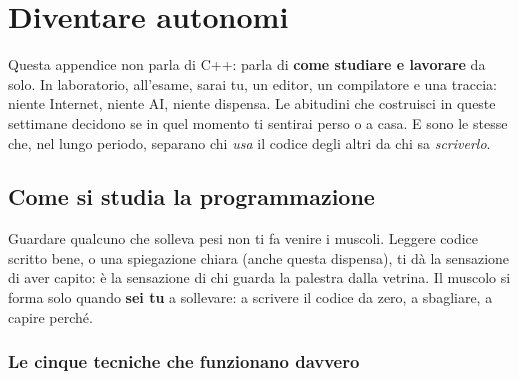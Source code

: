 \chapter{Diventare autonomi}

Questa appendice non parla di C++: parla di \textbf{come studiare e lavorare} da solo. In
laboratorio, all'esame, sarai tu, un editor, un compilatore e una traccia: niente
Internet, niente AI, niente dispensa. Le abitudini che costruisci in queste settimane
decidono se in quel momento ti sentirai perso o a casa. E sono le stesse che, nel lungo
periodo, separano chi \emph{usa} il codice degli altri da chi sa \emph{scriverlo}.

\section{Come si studia la programmazione}

\begin{analogia}[: la palestra]
Guardare qualcuno che solleva pesi non ti fa venire i muscoli. Leggere codice scritto
bene, o una spiegazione chiara (anche questa dispensa), ti dà la sensazione di aver
capito: è la sensazione di chi guarda la palestra dalla vetrina. Il muscolo si forma
solo quando \textbf{sei tu} a sollevare: a scrivere il codice da zero, a sbagliare, a
capire perché.
\end{analogia}

\subsection*{Le cinque tecniche che funzionano davvero}

